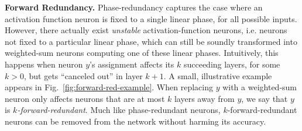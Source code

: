 \documentclass[10pt, conference, twocolumn, compsocconf]{IEEEtran}
\theoremstyle{remark}
\newcommand{\kfr}{$k$-forward-redundant}
\begin{document}
\medskip
\noindent
\textbf{Forward Redundancy.}  Phase-redundancy captures the case where
an activation function neuron is fixed to a single linear phase, for
all possible inputs. However, there actually exist \emph{unstable}
activation-function neurons, i.e. neurons not fixed to a particular
linear phase, which can still be soundly transformed into weighted-sum
neurons computing one of these linear phases. Intuitively, this
happens when neuron $y$'s assignment affects its $k$ succeeding
layers, for some $k>0$, but gets ``canceled out'' in layer $k+1$. A
small, illustrative example appears in
Fig.~\ref{fig:forward-red-example}.  When replacing $y$ with a
weighted-sum neuron only affects neurons that are at most $k$ layers
away from $y$, we say that $y$ is \emph{\kfr{}}. Much like
phase-redundant neurons, \kfr{} neurons can be removed from the
network without harming its accuracy.
\end{document}
